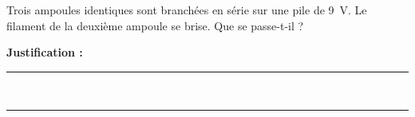 Trois ampoules identiques sont branchées en série sur une pile de \qty{9}{V}. Le filament de la deuxième ampoule se brise. Que se passe-t-il ?

\choices

\noindent\textbf{Justification :} \hrulefill \\[2.5ex]
\rule{\linewidth}{0.4pt} \\[2.5ex]
\rule{\linewidth}{0.4pt}
\vfill
